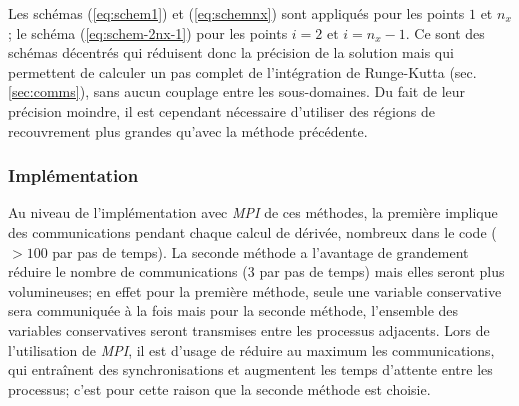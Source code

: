 

Les schémas (\ref{eq:schem1}) et (\ref{eq:schemnx}) sont appliqués pour les points $1$ et $n_x$; le schéma (\ref{eq:schem-2nx-1}) pour les points $i=2 \text{ et } i=n_x-1$. Ce sont des schémas décentrés qui réduisent donc la précision de la solution mais qui permettent de calculer un pas complet de l'intégration de Runge-Kutta (sec. \ref{sec:comms}), sans aucun couplage entre les sous-domaines. Du fait de leur précision moindre, il est cependant nécessaire d'utiliser des régions de recouvrement plus grandes qu'avec la méthode précédente.



\subsubsection{Implémentation}
Au niveau de l'implémentation avec \textit{MPI} de ces méthodes, la première implique des communications pendant chaque calcul de dérivée, nombreux dans le code ($>100$ par pas de temps). La seconde méthode a l'avantage de grandement réduire le nombre de communications ($3$ par pas de temps) mais elles seront plus volumineuses; en effet pour la première méthode, seule une variable conservative sera communiquée à la fois mais pour la seconde méthode, l'ensemble des variables conservatives seront transmises entre les processus adjacents. Lors de l'utilisation de \textit{MPI}, il est d'usage de réduire au maximum les communications, qui entraînent des synchronisations et augmentent les temps d'attente entre les processus; c'est pour cette raison que la seconde méthode est choisie.


%

